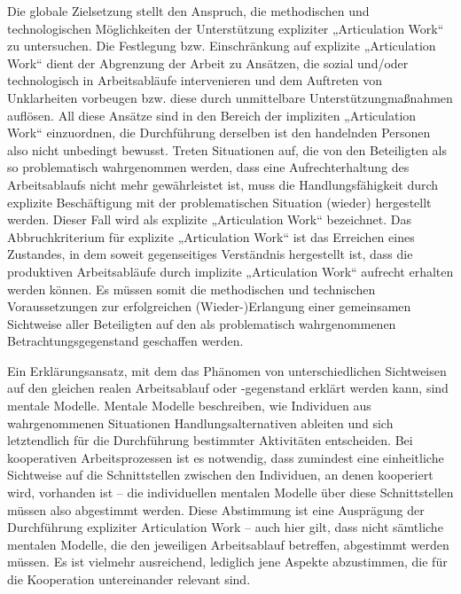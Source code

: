 Die globale Zielsetzung stellt den Anspruch, die methodischen und technologischen Möglichkeiten der Unterstützung expliziter „Articulation Work“ zu untersuchen. Die Festlegung bzw. Einschränkung auf explizite „Articulation Work“ dient der Abgrenzung der Arbeit zu Ansätzen, die sozial und/oder technologisch in Arbeitsabläufe intervenieren und dem Auftreten von Unklarheiten vorbeugen bzw. diese durch unmittelbare Unterstützungmaßnahmen auflösen. All diese Ansätze sind in den Bereich der impliziten „Articulation Work“ einzuordnen, die Durchführung derselben ist den handelnden Personen also nicht unbedingt bewusst. Treten Situationen auf, die von den Beteiligten als so problematisch wahrgenommen werden, dass eine Aufrechterhaltung des Arbeitsablaufs nicht mehr gewährleistet ist, muss die Handlungsfähigkeit durch explizite Beschäftigung mit der problematischen Situation (wieder) hergestellt werden. Dieser Fall wird als explizite „Articulation Work“ bezeichnet. Das Abbruchkriterium für explizite „Articulation Work“ ist das Erreichen eines Zustandes, in dem soweit gegenseitiges Verständnis hergestellt ist, dass die produktiven Arbeitsabläufe durch implizite „Articulation Work“ aufrecht erhalten werden können. Es müssen somit die methodischen und technischen Voraussetzungen zur erfolgreichen (Wieder-)Erlangung einer gemeinsamen Sichtweise aller Beteiligten auf den als problematisch wahrgenommenen Betrachtungsgegenstand geschaffen werden.

Ein Erklärungsansatz, mit dem das Phänomen von unterschiedlichen Sichtweisen auf den gleichen realen Arbeitsablauf oder -gegenstand erklärt werden kann, sind mentale Modelle. Mentale Modelle beschreiben, wie Individuen aus wahrgenommenen Situationen Handlungsalternativen ableiten und sich letztendlich für die Durchführung bestimmter Aktivitäten entscheiden. Bei kooperativen Arbeitsprozessen ist es notwendig, dass zumindest eine einheitliche Sichtweise auf die Schnittstellen zwischen den Individuen, an denen kooperiert wird, vorhanden ist -- die individuellen mentalen Modelle über diese Schnittstellen müssen also abgestimmt werden. Diese Abstimmung ist eine Ausprägung der Durchführung expliziter Articulation Work -- auch hier gilt, dass nicht sämtliche mentalen Modelle, die den jeweiligen Arbeitsablauf betreffen, abgestimmt werden müssen. Es ist vielmehr ausreichend, lediglich jene Aspekte abzustimmen, die für die Kooperation untereinander relevant sind.

